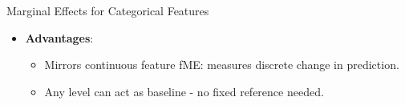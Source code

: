 \documentclass[10pt,compress,t,notes=noshow, xcolor=table]{beamer}
\begin{document}
\begin{frame}{Marginal Effects for Categorical Features}
\begin{itemize}
\item \textbf{Advantages}:
\begin{itemize}
\item Mirrors continuous feature fME: measures discrete change in prediction.
\item Any level can act as baseline - no fixed reference needed.
\end{itemize}
\end{itemize}
\end{frame}





\end{document}
